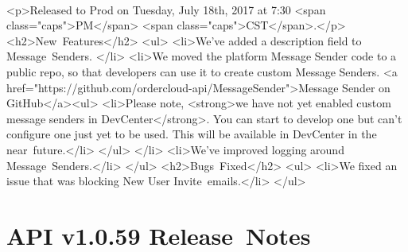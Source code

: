 \documentclass{memoir}%
\begin{document}
\paragraph*{}%
<p>Released to Prod on Tuesday, July 18th, 2017 at 7:30 <span class="caps">PM</span> <span class="caps">CST</span>.</p>\newline%
<h2>New~Features</h2>\newline%
<ul>\newline%
<li>We’ve added a description field to Message~Senders. </li>\newline%
<li>We moved the platform Message Sender code to a public repo, so that developers can use it to create custom Message Senders. <a href="https://github.com/ordercloud{-}api/MessageSender">Message Sender on GitHub</a><ul>\newline%
<li>Please note, <strong>we have not yet enabled custom message senders in DevCenter</strong>. You can start to develop one but can’t configure one just yet to be used. This will be available in DevCenter in the near~future.</li>\newline%
</ul>\newline%
</li>\newline%
<li>We’ve improved logging around Message~Senders.</li>\newline%
</ul>\newline%
<h2>Bugs~Fixed</h2>\newline%
<ul>\newline%
<li>We fixed an issue that was blocking New User Invite~emails.</li>\newline%
</ul>

%
\section*{API v1.0.59 Release~Notes}%
\paragraph*{}%

%
\end{document}
